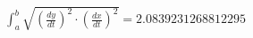 \documentclass[preview]{standalone}
\begin{document}
\begin{align*}
\int_{a}^{b} \sqrt{\left(\frac{dy}{dt}\right)^2 \cdot \left(\frac{dx}{dt}\right)^2} = 2.0839231268812295
\end{align*}
\end{document}
